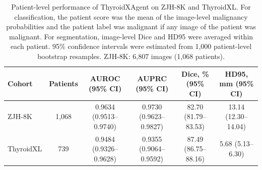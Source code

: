 \begin{table}[p]
\centering
\begin{threeparttable}

\caption{Patient-level performance of ThyroidXAgent on ZJH-8K and ThyroidXL. For classification, the patient score was the mean of the image-level malignancy probabilities and the patient label was malignant if any image of the patient was malignant. For segmentation, image-level Dice and HD95 were averaged within each patient. 95\% confidence intervals were estimated from 1{,}000 patient-level bootstrap resamples. ZJH-8K: 6{,}807 images (1{,}068 patients).}
\label{tab:patient_level}

\footnotesize
\setlength{\tabcolsep}{5.5pt}
\renewcommand{\arraystretch}{1.08}

\begin{tabular}{lccccc}
\toprule
\textbf{Cohort} & \textbf{Patients} & \textbf{AUROC (95\% CI)} & \textbf{AUPRC (95\% CI)} & \textbf{Dice, \% (95\% CI)} & \textbf{HD95, mm (95\% CI)} \\
\midrule
ZJH-8K & 1,068 & 0.9634 (0.9513--0.9740) & 0.9730 (0.9623--0.9827) & 82.70 (81.79--83.53) & 13.14 (12.30--14.04) \\
ThyroidXL & 739 & 0.9484 (0.9326--0.9628) & 0.9355 (0.9064--0.9592) & 87.49 (86.75--88.16) & 5.68 (5.13--6.30) \\
\bottomrule
\end{tabular}
\end{threeparttable}
\end{table}
\clearpage
